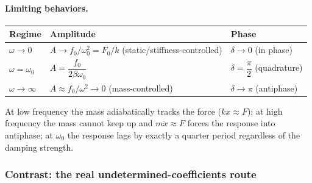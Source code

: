 \documentclass[11pt]{article}
\theoremstyle{plain}
\theoremstyle{definition}
\theoremstyle{remark}
\begin{document}
\paragraph{Limiting behaviors.}
\begin{center}
\begin{tabular}{lll}
\toprule
Regime & Amplitude & Phase \\
\midrule
$\omega \to 0$ & $A \to f_0/\omega_0^2 = F_0/k$ (static/stiffness-controlled) & $\delta\to 0$ (in phase) \\
$\omega = \omega_0$ & $A = \dfrac{f_0}{2\beta\omega_0}$ & $\delta = \dfrac{\pi}{2}$ (quadrature) \\
$\omega\to\infty$ & $A \approx f_0/\omega^2 \to 0$ (mass-controlled) & $\delta\to\pi$ (antiphase) \\
\bottomrule
\end{tabular}
\end{center}
At low frequency the mass adiabatically tracks the force ($kx \approx F$); at
high frequency the mass cannot keep up and $m\ddot x \approx F$ forces the
response into antiphase; at $\omega_0$ the response lags by exactly a quarter
period regardless of the damping strength.

\subsubsection{Contrast: the real undetermined-coefficients route}
\label{sec:real-method}
\end{document}
